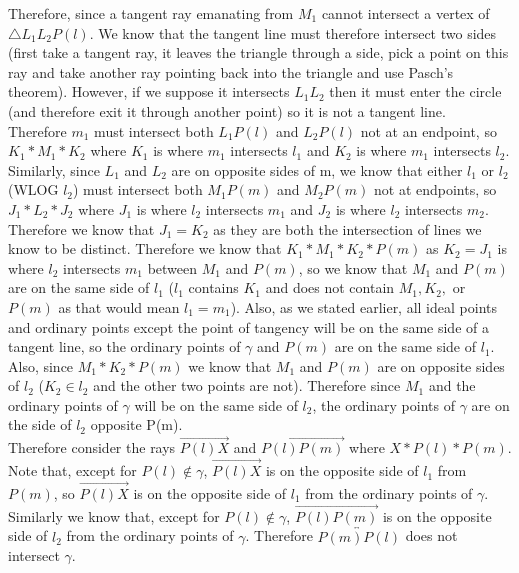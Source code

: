\documentclass[12pt,letterpaper]{article}
\begin{document}
Therefore, since a tangent ray emanating from $M_1$ cannot intersect a vertex of $\triangle L_1L_2P(l)$.   We know that the tangent line must therefore intersect two sides (first take a tangent ray, it leaves the triangle through a side, pick a point on this ray and take another ray pointing back into the triangle and use Pasch's theorem).  However, if we suppose it intersects $L_1L_2$ then it must enter the circle (and therefore exit it through another point) so it is not a tangent line. \\

Therefore $m_1$ must intersect both $L_1P(l)$ and $L_2P(l)$ not at an endpoint, so $K_1 * M_1 * K_2$ where $K_1$ is where $m_1$ intersects $l_1$ and $K_2$ is where $m_1$ intersects $l_2$.\\

Similarly, since $L_1$ and $L_2$ are on opposite sides of m, we know that either $l_1$ or $l_2$ (WLOG $l_2$) must intersect both $M_1P(m)$ and $M_2P(m)$ not at endpoints, so $J_1 * L_2 * J_2$ where $J_1$ is where $l_2$ intersects $m_1$ and $J_2$ is where $l_2$ intersects $m_2$.\\

Therefore we know that $J_1 = K_2$ as they are both the intersection of lines we know to be distinct.  Therefore we know that $K_1 * M_1 * K_2 * P(m)$ as $K_2 = J_1$ is where $l_2$ intersects $m_1$ between $M_1$ and $P(m)$, so we know that $M_1$ and $P(m)$ are on the same side of $l_1$ ($l_1$ contains $K_1$ and does not contain $M_1, K_2,$ or $P(m)$ as that would mean $l_1 = m_1$).  Also, as we stated earlier, all ideal points and ordinary points except the point of tangency will be on the same side of a tangent line, so the ordinary points of $\gamma$ and $P(m)$ are on the same side of $l_1$.\\

Also, since $M_1 * K_2 * P(m)$ we know that $M_1$ and $P(m)$ are on opposite sides of $l_2$ ($K_2 \in l_2$ and the other two points are not).  Therefore since $M_1$ and the ordinary points of $\gamma$ will be on the same side of $l_2$, the ordinary points of $\gamma$ are on the side of $l_2$ opposite P(m).\\

Therefore consider the rays $\overrightarrow{P(l)X}$ and $\overrightarrow{P(l)P(m)}$ where $X*P(l)*P(m)$.  Note that, except for $P(l) \not\in\gamma$, $\overrightarrow{P(l)X}$ is on the opposite side of $l_1$ from $P(m)$, so $\overrightarrow{P(l)X}$ is on the opposite side of $l_1$ from the ordinary points of $\gamma$.  Similarly we know that, except for $P(l) \not\in\gamma$, $\overrightarrow{P(l)P(m)}$ is on the opposite side of $l_2$ from the ordinary points of $\gamma$.  Therefore $\overleftrightarrow{P(m)P(l)}$ does not intersect $\gamma$.\\
\end{document}
